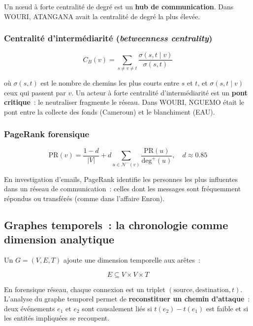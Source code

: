 Un nœud à forte centralité de degré est un \textbf{hub de communication}.
Dans WOURI, ATANGANA avait la centralité de degré la plus élevée.

\subsubsection{Centralité d'intermédiarité (\textit{betweenness centrality})}

\begin{equation}
C_B(v) = \sum_{s \neq v \neq t}
\frac{\sigma(s, t \mid v)}{\sigma(s, t)}
\label{eq:centralite-betweenness}
\end{equation}

où $\sigma(s,t)$ est le nombre de chemins les plus courts entre $s$ et $t$,
et $\sigma(s,t \mid v)$ ceux qui passent par $v$. Un acteur à forte centralité
d'intermédiarité est un \textbf{pont critique}~: le neutraliser fragmente
le réseau. Dans WOURI, NGUEMO était le pont entre la collecte des fonds
(Cameroun) et le blanchiment (EAU).

\subsubsection{PageRank forensique}

\begin{equation}
\mathrm{PR}(v) = \frac{1-d}{|V|} + d \sum_{u \in \mathcal{N}^{-}(v)}
\frac{\mathrm{PR}(u)}{\mathrm{deg}^+(u)}, \quad d \approx 0.85
\label{eq:pagerank}
\end{equation}

En investigation d'emails, PageRank identifie les personnes les plus influentes
dans un réseau de communication~: celles dont les messages sont fréquemment
répondus ou transférés (comme dans l'affaire Enron).

\subsection{Graphes temporels~: la chronologie comme dimension analytique}

Un  $G = (V, E, T)$ ajoute
une dimension temporelle aux arêtes~:

\begin{equation}
E \subseteq V \times V \times T
\label{eq:graphe-temporel}
\end{equation}

En forensique réseau, chaque connexion est un triplet
$(\text{source}, \text{destination}, t)$. L'analyse du graphe temporel
permet de \textbf{reconstituer un chemin d'attaque}~: deux événements $e_1$
et $e_2$ sont causalement liés si $t(e_2) - t(e_1)$ est faible et si les
entités impliquées se recoupent.

